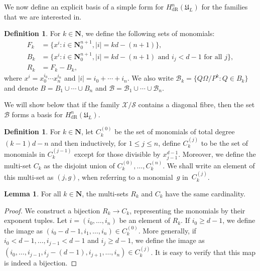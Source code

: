 \documentclass[a4paper,11pt]{article}
\numberwithin{equation}{section}
\providecommand{\abs}[1]{\lvert#1\rvert}                 %
\newcommand{\NN}{\mathbf{N}} %
\renewcommand{\to}{\rightarrow}        %
\providecommand{\HdR}{H_{\text{dR}}}    %
\providecommand{\cB}{\mathcal{B}} %
\theoremstyle{definition}
\newtheorem{lem}[thm]{Lemma}
\newtheorem{defn}[thm]{Definition}
\begin{document}
We now define an explicit basis of a simple form for $\HdR^{n}(\mathfrak{U}_L)$ 
for the families that we are interested in.

\begin{defn} \label{defn:MonBasis}
For $k \in \NN$, we define the following sets of monomials: 
\begin{align*}
F_k & = \{ x^i : i \in \mathbf{N}_{0}^{n+1}, \abs{i} = k d - (n+1) \}, \\
B_k & = \{ x^i : i \in \mathbf{N}_{0}^{n+1}, \abs{i} = k d - (n+1) \text{ and $i_j < d-1$ for all $j$}\}, \\
R_k & = F_k - B_k,
\end{align*}
where $x^i = x_0^{i_0} \dotsm x_n^{i_n}$ and $\abs{i} = i_0 + \dotsb + i_n$. 
We also write $\cB_k = \{Q \Omega / P^k : Q \in B_k\}$ and denote
$B = B_1 \cup \dotsb \cup B_n$ and $\cB = \cB_1 \cup \dotsb \cup \cB_n$.
\end{defn}

We will show below that if the family $\mathcal{X}/{\mathcal{S}}$ contains 
a diagonal fibre, then the set $\cB$ forms a basis for $\HdR^n(\mathfrak{U}_L)$.

\begin{defn} \label{defn:IndexSets}
For $k \in \NN$, let $C_k^{(0)}$ be the set of monomials of total 
degree $(k-1)d - n$ and then inductively, for $1 \leq j \leq n$, define 
$C_k^{(j)}$ to be the set of monomials in $C_k^{(j-1)}$ except for those 
divisible by $x_{j-1}^{d-1}$.  Moreover, we define the multi-set $C_k$ as 
the disjoint union of $C_k^{(0)}, \dotsc, C_k^{(n)}$.  We shall write an 
element of this multi-set as $(j, g)$, when referring to a monomial~$g$ 
in~$C_k^{(j)}$.
\end{defn}

\begin{lem} \label{lem:bijection}
For all $k \in \NN$, the multi-sets $R_k$ and $C_k$ 
have the same cardinality.
\end{lem}

\begin{proof}
We construct a bijection $R_k \to C_k$, representing the 
monomials by their exponent tuples.  Let $i = (i_0, \dotsc, i_n)$ be an
element of $R_k$.  If $i_0 \geq d-1$, we define the image as
$(i_0-d-1, i_1, \dotsc, i_n) \in C_k^{(0)}$.  More generally, if 
$i_0 < d-1, \dotsc, i_{j-1} < d-1$ and $i_j \geq d-1$, we define the image as 
$(i_0, \dotsc, i_{j-1}, i_j-(d-1), i_{j+1}, \dotsc, i_n) \in C_k^{(j)}$.  
It is easy to verify that this map is indeed a bijection.
\end{proof}
\end{document}
